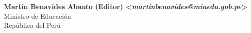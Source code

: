 \begin{center}
\textbf{Martin Benavides Abanto (Editor) <\textit{martinbenavides@minedu.gob.pe}>}\\ 
Ministro de Educación\\
República del Perú\\
\end{center}
